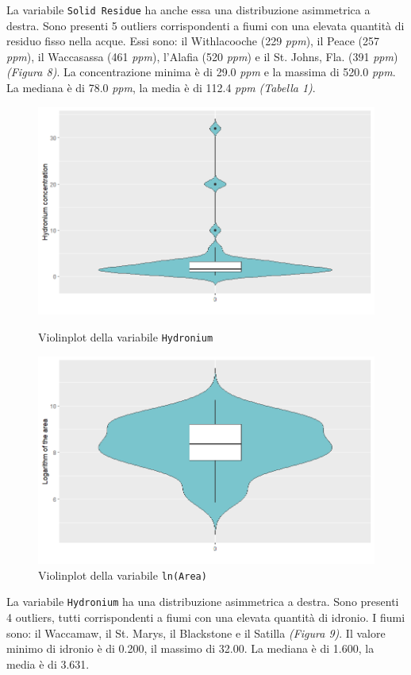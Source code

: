 \documentclass{article} %
\begin{document}
La variabile \texttt{Solid Residue} ha anche essa una distribuzione asimmetrica a destra. Sono presenti 5 outliers corrispondenti a fiumi con una elevata quantità di residuo fisso nella acque. Essi sono: il Withlacooche (229 \textit{ppm}), il Peace (257 \textit{ppm}), il Waccasassa (461 \textit{ppm}), l'Alafia (520 \textit{ppm}) e il St. Johns, Fla. (391 \textit{ppm}) \textit{(Figura 8)}. La concentrazione minima è di 29.0 \textit{ppm} e la massima di 520.0 \textit{ppm}. La mediana è di 78.0 \textit{ppm}, la media è di 112.4 \textit{ppm} \textit{(Tabella 1)}.


\begin{figure}[H]
    \centering
    \begin{minipage}{0.49\textwidth}
        \centering
        \includegraphics[width=\textwidth]{immagini/vp_hy.png}
        \captionsetup{justification=centering}
        \caption{Violinplot della variabile \texttt{Hydronium}}
    \end{minipage}
    \hfill
    \begin{minipage}{0.49\textwidth}
        \centering
        \includegraphics[width=\textwidth]{immagini/vp_ln.png}
        \captionsetup{justification=centering}
        \caption{Violinplot della variabile \texttt{ln(Area)}}
    \end{minipage}
\end{figure}
La variabile \texttt{Hydronium} ha una distribuzione asimmetrica a destra. Sono presenti 4 outliers, tutti corrispondenti a fiumi con una elevata quantità di idronio. I fiumi sono: il Waccamaw, il St. Marys, il Blackstone e il Satilla \textit{(Figura 9)}. Il valore minimo di idronio è di 0.200, il massimo di 32.00. La mediana è di 1.600, la media è di 3.631.
\end{document}
